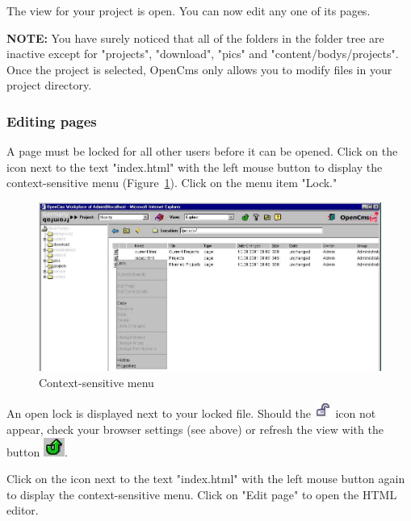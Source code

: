 The view for your project is open. You can now edit any one of its pages.

\textbf{NOTE:} You have surely noticed that all of the folders in
the folder tree are inactive except for "projects", "download",
"pics" and "content/bodys/projects". Once the project is selected,
OpenCms only allows you to modify files in your project directory.

\subsubsection{Editing pages}

A page must be locked for all other users before it can be opened.
Click on the icon next to the text "index.html" with the left
mouse button to display the context-sensitive menu
(Figure~\ref{lockpage}). Click on the menu item "Lock."

\begin{figure}[hbt]
\begin{center}
\includegraphics[width=\sgw]
                   {pics/usermanual/pageMenuUnlocked}
\caption[Context-sensitive menu]
           {Context-sensitive menu}
\label{lockpage}
\end{center}
\end{figure}

An open lock is displayed next to your locked file. Should the
\includegraphics{pics/usermanual/ic_locked}
icon not appear, check your browser settings (see above) or
refresh the view with the button
\includegraphics{pics/usermanual/ic_refresh}.

Click on the icon next to the text "index.html" with the left
mouse button again to display the context-sensitive menu. Click on
"Edit page" to open the HTML editor.

